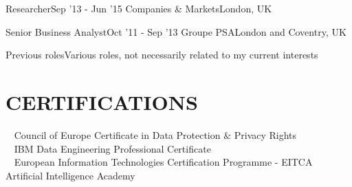 \documentclass[letterpaper,11pt]{article}
\begin{document}
\resumeSubheading
{Researcher}{Sep '13 - Jun '15}
{Companies \& Markets}{London, UK}
\resumeItemListStart
{}
\resumeItemListEnd

\resumeSubheading
{Senior Business Analyst}{Oct '11 - Sep '13}
{Groupe PSA}{London and Coventry, UK}
\resumeItemListStart
{}
\resumeItemListEnd

\resumeSubheading
{Previous roles}{}{Various roles, not necessarily related to my current interests}{}
\resumeItemListStart
{}
\resumeItemListEnd
\resumeSubHeadingListEnd

\section{CERTIFICATIONS}
 \begin{itemize}[leftmargin=0in, label={}]
\small{\item{
\textbf{~} { Council of Europe Certificate in Data Protection \& Privacy Rights }\vspace{2pt} \\
\textbf{~} { IBM Data Engineering Professional Certificate} \vspace{2pt} \\
\textbf{~} { European Information Technologies Certification Programme - EITCA Artificial Intelligence Academy}   
    }}
 \end{itemize}
 

\end{document}
